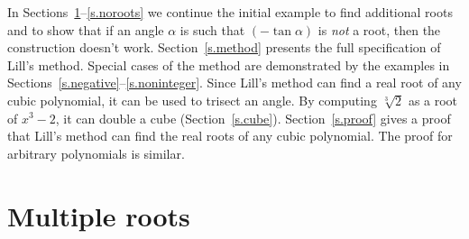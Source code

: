 In Sections~\ref{s.multiple}--\ref{s.noroots} we continue the initial example to find additional roots and to show that if an angle $\alpha$ is such that $(-\tan\alpha)$ is \emph{not} a root, then the construction doesn't work. Section~\ref{s.method} presents the full specification of Lill's method. Special cases of the method are demonstrated by the examples in Sections~\ref{s.negative}--\ref{s.noninteger}. Since Lill's method can find a real root of any cubic polynomial, it can be used to trisect an angle. By computing $\sqrt[3]{2}$ as a root of $x^3-2$, it can double a cube (Section~\ref{s.cube}). Section~\ref{s.proof} gives a proof that Lill's method can find the real roots of any cubic polynomial. The proof for arbitrary polynomials is similar.


\section{Multiple roots}\label{s.multiple}

